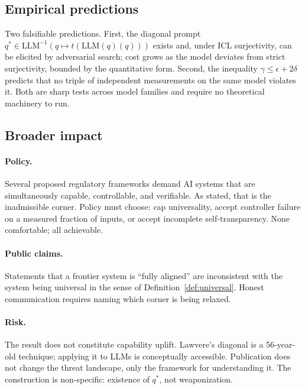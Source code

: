 \subsection{Empirical predictions}
\label{sec:empirical-predictions}

Two falsifiable predictions. First, the diagonal prompt $q^* \in \mathrm{LLM}^{-1}(q \mapsto t(\mathrm{LLM}(q)(q)))$ exists and, under ICL surjectivity, can be elicited by adversarial search; cost grows as the model deviates from strict surjectivity, bounded by the quantitative form. Second, the inequality $\gamma \le \epsilon + 2\delta$ predicts that no triple of independent measurements on the same model violates it. Both are sharp tests across model families and require no theoretical machinery to run.

\subsection{Broader impact}
\label{sec:broader-impact}

\paragraph{Policy.}
Several proposed regulatory frameworks demand AI systems that are simultaneously capable, controllable, and verifiable. As stated, that is the inadmissible corner. Policy must choose: cap universality, accept controller failure on a measured fraction of inputs, or accept incomplete self-transparency. None comfortable; all achievable.

\paragraph{Public claims.}
Statements that a frontier system is ``fully aligned'' are inconsistent with the system being universal in the sense of Definition~\ref{def:universal}. Honest communication requires naming which corner is being relaxed.

\paragraph{Risk.}
The result does not constitute capability uplift. Lawvere's diagonal is a 56-year-old technique; applying it to LLMs is conceptually accessible. Publication does not change the threat landscape, only the framework for understanding it. The construction is non-specific: existence of $q^*$, not weaponization.

